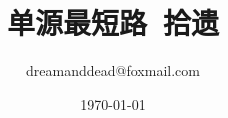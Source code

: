 \documentclass{article}
\title{单源最短路\ 拾遗}
\author{dreamanddead@foxmail.com}
\date{\today}
\begin{document}
 
\maketitle



\section{}
\end{document}
